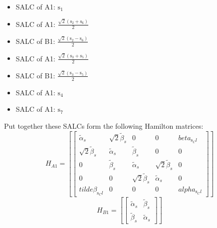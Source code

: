 \documentclass[12pt,a4paper]{article}
\begin{document}
\begin{itemize}
\item SALC of A1: \quad $\text{s}_{1}$
\item SALC of A1: \quad $\frac{\sqrt{2} \left(\text{s}_{2} + \text{s}_{6}\right)}{2}$
\item SALC of B1: \quad $\frac{\sqrt{2} \left(\text{s}_{2} - \text{s}_{6}\right)}{2}$
\item SALC of A1: \quad $\frac{\sqrt{2} \left(\text{s}_{3} + \text{s}_{5}\right)}{2}$
\item SALC of B1: \quad $\frac{\sqrt{2} \left(\text{s}_{3} - \text{s}_{5}\right)}{2}$
\item SALC of A1: \quad $\text{s}_{4}$
\item SALC of A1: \quad $\text{s}_{7}$
\end{itemize}
Put together these SALCs form the following Hamilton matrices:
     $$ H_{A1}= \left[\begin{bmatrix}\tilde{\alpha}_{s} & \sqrt{2} \tilde{\beta}_{s} & 0 & 0 & beta_{\text{s}_Cl}\\\sqrt{2} \tilde{\beta}_{s} & \tilde{\alpha}_{s} & \tilde{\beta}_{s} & 0 & 0\\0 & \tilde{\beta}_{s} & \tilde{\alpha}_{s} & \sqrt{2} \tilde{\beta}_{s} & 0\\0 & 0 & \sqrt{2} \tilde{\beta}_{s} & \tilde{\alpha}_{s} & 0\\tilde{\beta}_{\text{s}_Cl} & 0 & 0 & 0 & alpha_{\text{s}_Cl}\end{bmatrix}\right]$$ 
     $$ H_{B1}= \left[\begin{bmatrix}\tilde{\alpha}_{s} & \tilde{\beta}_{s}\\\tilde{\beta}_{s} & \tilde{\alpha}_{s}\end{bmatrix}\right]$$ 
\end{document}
